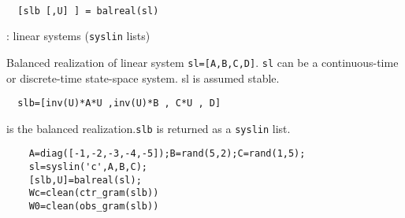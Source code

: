\begin{mandesc}
   \\ %
\end{mandesc}
\begin{calling_sequence}
\begin{verbatim}
  [slb [,U] ] = balreal(sl)  
\end{verbatim}
\end{calling_sequence}
\begin{parameters}
  \begin{varlist}
    : linear systems (\verb!syslin! lists)
  \end{varlist}
\end{parameters}
\begin{mandescription}
  Balanced realization of linear system \verb!sl=[A,B,C,D]!. \verb!sl!
  can be a continuous-time or discrete-time state-space system. 
  sl is assumed stable.
\begin{verbatim}
  slb=[inv(U)*A*U ,inv(U)*B , C*U , D]
\end{verbatim}
is the balanced realization.\verb!slb! is returned as a \verb!syslin! list.
\end{mandescription}
\begin{examples}
  \begin{Verbatim}
    A=diag([-1,-2,-3,-4,-5]);B=rand(5,2);C=rand(1,5);
    sl=syslin('c',A,B,C);
    [slb,U]=balreal(sl);
    Wc=clean(ctr_gram(slb))
    W0=clean(obs_gram(slb))
  \end{Verbatim}
\end{examples}
\begin{manseealso}
        
\end{manseealso}
